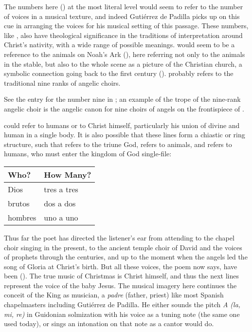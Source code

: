 The numbers here () at the most
literal level would seem to refer to the number of voices in a musical texture,
and indeed Gutiérrez de Padilla picks up on this cue in arranging the voices for
his musical setting of this passage.
These numbers, like , also have theological
significance in the traditions of interpretation around Christ's nativity, with
a wide range of possible meanings.
 would seem to be a reference to the animals on Noah's Ark
(), here referring not only to the animals in the stable, but
also to the whole scene as a picture of the Christian church, a symbolic
connection going back to the first century ().%
    \Autocite[15]{Augustine:CivitateDei}
 probably refers to the traditional nine ranks of angelic
choirs.%
    \begin{Footnote}
        See the entry for the number nine in \autocite{Bongo:NumerorumMysteria};
        an example of the trope of the nine-rank angelic choir is the angelic
        canon for nine choirs of angels on the frontispiece of
        \autocite{Kircher:Musurgia}.
    \end{Footnote}
 could refer to humans or to Christ himself, particularly his
union of divine and human in a single body.
It is also possible that these lines form a chiastic or ring structure, such
that  refers to the triune God, 
refers to animals, and  refers to humans, who must enter the
kingdom of God single-file:
\begin{center}
    \begin{tabular}{ll}
        \toprule
        Who?    & How Many? \\
        \midrule
        Dios    & tres a tres \\
        brutos  & dos a dos \\
        hombres & uno a uno \\
        \bottomrule
    \end{tabular}
\end{center}

Thus far the poet has directed the listener's ear from attending to the chapel
choir singing in the present, to the ancient temple choir of David and the
voices of prophets through the centuries, and up to the moment when the angels
led the song of Gloria at Christ's birth.
But all these voices, the poem now says, have been  ().
The true music of Christmas is Christ himself, and thus the next lines represent
the voice of the baby Jesus.
The musical imagery here continues the conceit of the King as musician, a
\emph{padre} (father, priest) like most Spanish chapelmasters including
Gutiérrez de Padilla.
He either sounds the pitch \emph{A (la, mi, re)} in Guidonian solmization with
his voice as a tuning note (the same one used today), or sings an intonation on
that note as a cantor would do.


